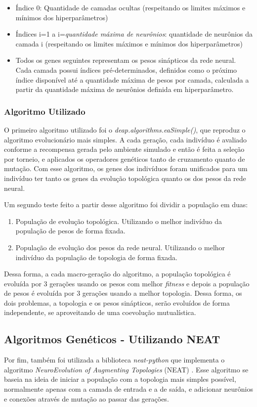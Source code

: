 \documentclass[12pt]{article}
\begin{document}
\begin{itemize}
    \item Índice 0: Quantidade de camadas ocultas (respeitando os limites máximos e mínimos dos hiperparâmetros)
    \item Índices i=1 a i=\textit{quantidade máxima de neurônios}: quantidade de neurônios da camada i (respeitando os limites máximos e mínimos dos hiperparâmetros)
    \item Todos os genes seguintes representam os pesos sinápticos da rede neural. Cada camada possui índices pré-determinados, definidos como o próximo índice disponível até a quantidade máxima de pesos por camada, calculada a partir da quantidade máxima de neurônios definida em hiperparâmetro.
\end{itemize}

\subsubsection{Algoritmo Utilizado}
O primeiro algoritmo utilizado foi o \textit{deap.algorithms.eaSimple()}, que reproduz o algoritmo evolucionário mais simples. A cada geração, cada indivíduo é avaliado conforme a recompensa gerada pelo ambiente simulado e então é feita a seleção por torneio, e aplicados os operadores genéticos tanto de cruzamento quanto de mutação. Com esse algoritmo, os genes dos indivíduos foram unificados para um indivíduo ter tanto os genes da evolução topológica quanto os dos pesos da rede neural.

Um segundo teste feito a partir desse algoritmo foi dividir a população em duas:
\begin{enumerate}
    \item População de evolução topológica. Utilizando o melhor indivíduo da população de pesos de forma fixada.
    \item População de evolução dos pesos da rede neural. Utilizando o melhor indivíduo da população de topologia de forma fixada.
\end{enumerate}

Dessa forma, a cada macro-geração do algoritmo, a população topológica é evoluída por 3 gerações usando os pesos com melhor \textit{fitness} e depois a população de pesos é evoluída por 3 gerações usando a melhor topologia. Dessa forma, os dois problemas, a topologia e os pesos sinápticos, serão evoluídos de forma independente, se aproveitando de uma coevolução mutualística.

\subsection{Algoritmos Genéticos - Utilizando NEAT}
Por fim, também foi utilizada a biblioteca \textit{neat-python} \cite{McIntyre_neat-python} que implementa o algoritmo \textit{NeuroEvolution of Augmenting Topologies} (NEAT) \cite{neat_original}. Esse algoritmo se baseia na ideia de iniciar a população com a topologia mais simples possível, normalmente apenas com a camada de entrada e a de saída, e adicionar neurônios e conexões através de mutação ao passar das gerações.
\end{document}
